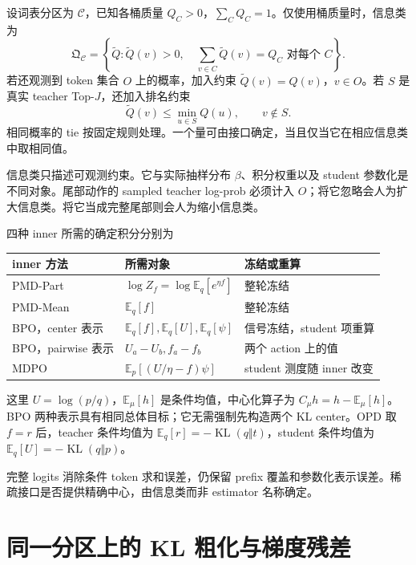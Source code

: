 \documentclass[lang=cn,scheme=chinese,openany]{../book/elegantbook}
\newcommand{\E}{\mathbb E}
\newcommand{\KL}{\operatorname{KL}}
\begin{document}
\begin{definition}[与观测一致的参考分布]
\label{inf:compatible}
设词表分区为 $\mathcal C$，已知各桶质量 $Q_C>0$，$\sum_CQ_C=1$。仅使用桶质量时，信息类为
\begin{equation}
\mathfrak Q_{\mathcal C}=\left\{\widetilde Q:\widetilde Q(v)>0,\quad \sum_{v\in C}\widetilde Q(v)=Q_C\text{ 对每个 }C\right\}.
\end{equation}
若还观测到 token 集合 $O$ 上的概率，加入约束 $\widetilde Q(v)=Q(v)$，$v\in O$。若 $S$ 是真实 teacher Top-$J$，还加入排名约束
\begin{equation}
\widetilde Q(v)\leq\min_{u\in S}Q(u),\qquad v\notin S.
\end{equation}
相同概率的 tie 按固定规则处理。一个量可由接口确定，当且仅当它在相应信息类中取相同值。
\end{definition}

信息类只描述可观测约束。它与实际抽样分布 $\beta$、积分权重以及 student 参数化是不同对象。尾部动作的 sampled teacher log-prob 必须计入 $O$；将它忽略会人为扩大信息类。将它当成完整尾部则会人为缩小信息类。

四种 inner 所需的确定积分分别为
\begin{center}
\begin{tabular}{lll}
\toprule
inner 方法 & 所需对象 & 冻结或重算\\
\midrule
PMD-Part & $\log Z_f=\log\E_q[e^{\eta f}]$ & 整轮冻结\\
PMD-Mean & $\E_q[f]$ & 整轮冻结\\
BPO，center 表示 & $\E_q[f],\E_q[U],\E_q[\psi]$ & 信号冻结，student 项重算\\
BPO，pairwise 表示 & $U_a-U_b, f_a-f_b$ & 两个 action 上的值\\
MDPO & $\E_p[(U/\eta-f)\psi]$ & student 测度随 inner 改变\\
\bottomrule
\end{tabular}
\end{center}
这里 $U=\log(p/q)$，$\E_\mu[h]$ 是条件均值，中心化算子为 $C_\mu h=h-\E_\mu[h]$。BPO 两种表示具有相同总体目标；它无需强制先构造两个 KL center。OPD 取 $f=r$ 后，teacher 条件均值为 $\E_q[r]=-\KL(q\Vert t)$，student 条件均值为 $\E_q[U]=-\KL(q\Vert p)$。

完整 logits 消除条件 token 求和误差，仍保留 prefix 覆盖和参数化表示误差。稀疏接口是否提供精确中心，由信息类而非 estimator 名称确定。



\section{同一分区上的 KL 粗化与梯度残差}
\label{inf:sec:kl-partition-geometry}
\label{inf:sec:kl-partition}
\end{document}

